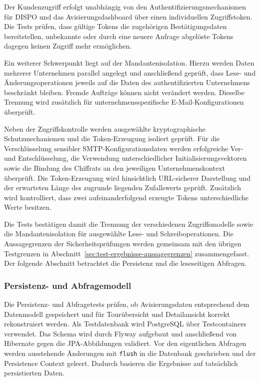 \documentclass[
  12pt,
  a4paper,
  oneside
]{article}
\begin{document}
Der Kundenzugriff erfolgt unabhängig von den Authentifizierungsmechanismen für
DISPO und das Avisierungsdashboard über einen individuellen Zugriffstoken. Die
Tests prüfen, dass gültige Tokens die zugehörigen Bestätigungsdaten bereitstellen,
unbekannte oder durch eine neuere Anfrage abgelöste Tokens dagegen keinen Zugriff
mehr ermöglichen.

Ein weiterer Schwerpunkt liegt auf der Mandantenisolation. Hierzu werden Daten
mehrerer Unternehmen parallel angelegt und anschließend geprüft, dass Lese- und
Änderungsoperationen jeweils auf die Daten des authentifizierten Unternehmens
beschränkt bleiben. Fremde Aufträge können nicht verändert werden. Dieselbe
Trennung wird zusätzlich für unternehmensspezifische E-Mail-Konfigurationen
überprüft.

Neben der Zugriffskontrolle werden ausgewählte kryptographische
Schutzmechanismen und die Token-Erzeugung isoliert geprüft. Für die
Verschlüsselung sensibler SMTP-Konfigurationsdaten werden erfolgreiche Ver- und
Entschlüsselung, die Verwendung unterschiedlicher Initialisierungsvektoren sowie
die Bindung des Chiffrats an den jeweiligen Unternehmenskontext überprüft. Die
Token-Erzeugung wird hinsichtlich URL-sicherer Darstellung und der erwarteten
Länge des zugrunde liegenden Zufallswerts geprüft. Zusätzlich wird kontrolliert,
dass zwei aufeinanderfolgend erzeugte Tokens unterschiedliche Werte besitzen.

Die Tests bestätigen damit die Trennung der verschiedenen Zugriffsmodelle sowie
die Mandantenisolation für ausgewählte Lese- und Schreiboperationen. Die
Aussagegrenzen der Sicherheitsprüfungen werden gemeinsam mit den übrigen
Testgrenzen in Abschnitt~\ref{sec:test-ergebnisse-aussagegrenzen}
zusammengefasst. Der folgende Abschnitt betrachtet die Persistenz und die
leseseitigen Abfragen.

\subsubsection{Persistenz- und Abfragemodell}
\label{sec:test-persistenz-abfragemodell}

Die Persistenz- und Abfragetests prüfen, ob Avisierungsdaten entsprechend dem
Datenmodell gespeichert und für Tourübersicht und Detailansicht korrekt
rekonstruiert werden. Als Testdatenbank wird PostgreSQL über Testcontainers
verwendet. Das Schema wird durch Flyway aufgebaut und anschließend von
Hibernate gegen die JPA-Abbildungen validiert. Vor den eigentlichen Abfragen
werden ausstehende Änderungen mit \texttt{flush} in die Datenbank geschrieben
und der Persistence Context geleert. Dadurch basieren die Ergebnisse auf
tatsächlich persistierten Daten.
\end{document}

